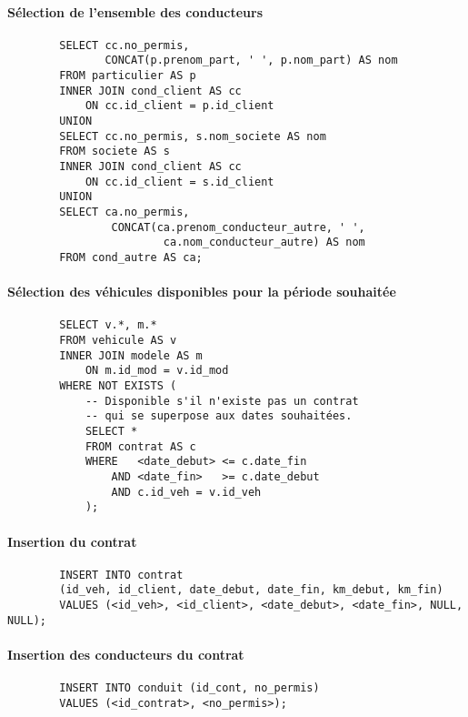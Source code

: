 \documentclass[a4paper]{article}
\begin{document}
    \paragraph{Sélection de l'ensemble des conducteurs}
    \begin{verbatim}
        SELECT cc.no_permis,
               CONCAT(p.prenom_part, ' ', p.nom_part) AS nom
        FROM particulier AS p
        INNER JOIN cond_client AS cc
            ON cc.id_client = p.id_client
        UNION
        SELECT cc.no_permis, s.nom_societe AS nom
        FROM societe AS s
        INNER JOIN cond_client AS cc
            ON cc.id_client = s.id_client
        UNION
        SELECT ca.no_permis,
                CONCAT(ca.prenom_conducteur_autre, ' ', 
                        ca.nom_conducteur_autre) AS nom
        FROM cond_autre AS ca;
    \end{verbatim}

    \paragraph{Sélection des véhicules disponibles pour la période souhaitée}
    \begin{verbatim}
        SELECT v.*, m.*
        FROM vehicule AS v
        INNER JOIN modele AS m
            ON m.id_mod = v.id_mod
        WHERE NOT EXISTS (
            -- Disponible s'il n'existe pas un contrat
            -- qui se superpose aux dates souhaitées.
            SELECT *
            FROM contrat AS c
            WHERE   <date_debut> <= c.date_fin
                AND <date_fin>   >= c.date_debut
                AND c.id_veh = v.id_veh
            );
    \end{verbatim}

    \paragraph{Insertion du contrat}
    \begin{verbatim}
        INSERT INTO contrat
        (id_veh, id_client, date_debut, date_fin, km_debut, km_fin)
        VALUES (<id_veh>, <id_client>, <date_debut>, <date_fin>, NULL, NULL);
    \end{verbatim}

    \paragraph{Insertion des conducteurs du contrat}
    \begin{verbatim}
        INSERT INTO conduit (id_cont, no_permis)
        VALUES (<id_contrat>, <no_permis>);
    \end{verbatim}
\end{document}
